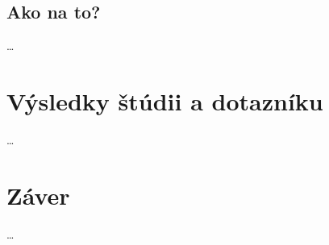 \documentclass[10pt,oneside,slovak,a4paper]{article}
\begin{document}
\subsection{Ako na to?}\label{navrhovanie:ako}
\ldots

\section{Výsledky štúdii a dotazníku} \label{dolezitejsia}
\ldots
\section{Záver} \label{zaver} %
\ldots


\end{document}
